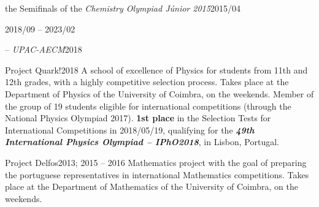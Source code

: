 \documentclass{cv}
\newif\ifen
\newif\ifpt
\newcommand{\en}[1]{\ifen#1\fi}
\newcommand{\pt}[1]{\ifpt#1\fi}
\begin{document}
\begin{jobopt}{\en{Participation in} the Semifinals of the \textit{Chemistry Olympiad Júnior 2015}}{2015/04}
\begin{job}{\en{FEUP-SWERC community}}{2018/09 -- 2023/02}
    \pt{Comunidade colaborativa de estudantes e professores da Faculdade de Engenharia da Universidade do Porto, com o objetivo de incentivar a programação competitiva na comunidade FEUP, promovendo competições de programação e selecionando/preparando os estudantes da FEUP para competições de programação nacionais, europeias e internacionais.}
\end{job}
\begin{jobopt}{\en{Schools Participatory Budget} -- \en{Proposal} \textit{UPAC-AECM}}{2018}
    \en{Second proponent of proposal UPAC-AECM, consisting of the installation of a Self-Consumption Unit, made of a set of photovoltaic panels, in Castêlo da Maia Secondary School. Winning proposal of the election held on 2018/03/23, by absolute majority (50.3\% of valid votes).}
    \pt{2º proponente da proposta UPAC-AECM, consistindo da instalação de uma Unidade de Auto-Consumo, constituída por um conjunto de painéis solares, na Escola Secundária do Castêlo da Maia. Proposta vencedora da eleição realizada a 2018/03/23.}
\end{jobopt}
\begin{jobopt}{Project Quark!}{2018}
    A school of excellence of Physics for students from 11th and 12th grades, with a highly competitive selection process. Takes place at the Department of Physics of the University of Coimbra, on the weekends. Member of the group of 19 students eligible for international competitions (through the National Physics Olympiad 2017). \textbf{1st place} in the Selection Tests for International Competitions in 2018/05/19, qualifying for the \textbf{\textit{49th International Physics Olympiad -- IPhO2018}}, in Lisbon, Portugal.
\end{jobopt}
\begin{jobopt}{Project Delfos}{2013; 2015 -- 2016}
    Mathematics project with the goal of preparing the portuguese representatives in international Mathematics competitions. Takes place at the Department of Mathematics of the University of Coimbra, on the weekends.
\end{jobopt}

\subsection*{\en{Forums, lectures, conferences \& congresses}}


\end{jobopt}
\end{document}
